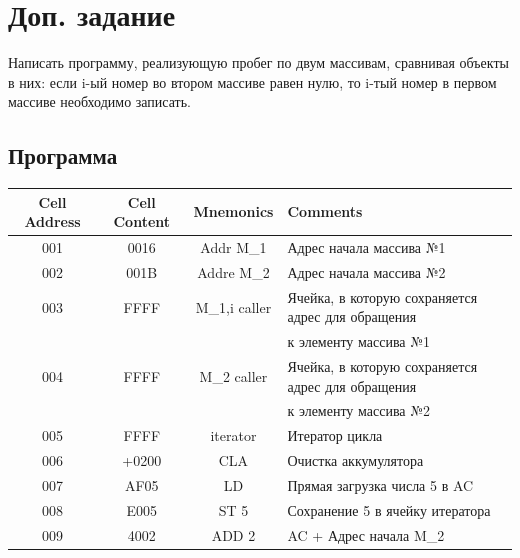 \section{Доп. задание}
Написать программу, реализующую пробег по двум массивам, сравнивая объекты в них: если i-ый номер во втором массиве
равен нулю, то i-тый номер в первом массиве необходимо записать.

\subsection{Программа}
\begin{center}
    \begin{tabular}{|c|c|c|l|}
        \hline
        \textbf{Cell Address} & \textbf{Cell Content} & \textbf{Mnemonics} & \textbf{Comments}                                 \\
        \hline
        001                   & 0016                  & Addr M_{1}         & Адрес начала массива №1                           \\
        002                   & 001B                  & Addre M_{2}        & Адрес начала массива №2                           \\
        003                   & FFFF                  & M_{1,i} caller     & Ячейка, в которую сохраняется адрес для обращения \\
        &                       &                    & к элементу массива №1                             \\
        004                   & FFFF                  & M_{2} caller       & Ячейка, в которую сохраняется адрес для обращения \\
        &                       &                    & к элементу массива №2                             \\
        005                   & FFFF                  & iterator           & Итератор цикла                                    \\
        006                   & +0200                 & CLA                & Очистка аккумулятора                              \\
        007                   & AF05                  & LD #5              & Прямая загрузка числа 5 в AC                      \\
        008                   & E005                  & ST 5               & Сохранение 5 в ячейку итератора                   \\
        009                   & 4002                  & ADD 2              & AC + Адрес начала M_{2}                           \\

\end{tabular}
\end{center}
